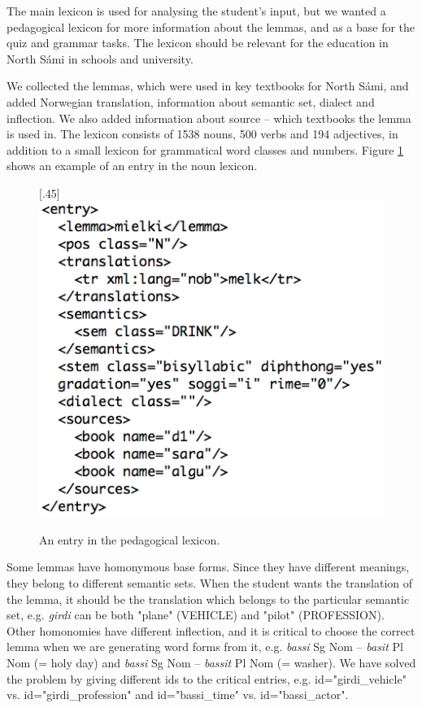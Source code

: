 \documentclass[11pt]{article}
\begin{document}
The main lexicon is used for analysing the student's input, but we wanted a pedagogical lexicon for more information about the lemmas, and as a base for the quiz and grammar tasks. The lexicon should be relevant for the education in North Sámi in schools and university. 

We collected the lemmas, which were used in key textbooks for North Sámi, and added Norwegian translation, information about semantic set, dialect and inflection. We also added information about source -- which textbooks the lemma is used in. %
The lexicon consists of 1538 nouns, 500 verbs and 194 adjectives, in addition to a small lexicon for grammatical word classes and numbers. Figure \ref{nounlex} shows an example of an entry in the noun lexicon. \\

\begin{figure}[tbp]
\begin{center}
\scalebox{.45}[.45]{\includegraphics{presentation/img/nounlexicon2.png}}\\
\caption{An entry in the pedagogical lexicon.}
\label{nounlex}
\end{center}
\end{figure}

Some lemmas have homonymous base forms. Since they have different meanings, they belong to different semantic sets. When the student wants the translation of the lemma, it should be the translation which belongs to the particular semantic set, e.g. \textit{girdi} can be both "plane" (VEHICLE) and "pilot" (PROFESSION). Other homonomies have different inflection, and it is critical to choose the correct lemma when we are generating word forms from it, e.g. \textit{bassi} Sg Nom -- \textit{basit} Pl Nom (= holy day) and \textit{bassi} Sg Nom -- \textit{bassit} Pl Nom (= washer). We have solved the problem by giving different ids to the critical entries, e.g. id="girdi\_vehicle" vs. 
id="girdi\_profession" and id="bassi\_time" vs. id="bassi\_actor".
\end{document}
